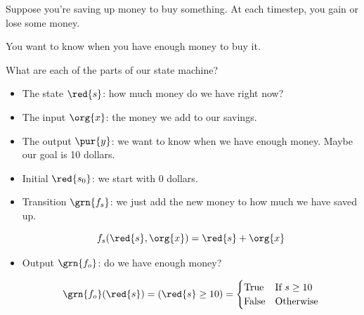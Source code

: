             Suppose you're saving up money to buy something. At each timestep, you gain or lose some money. 
            
            You want to know when you have enough money to buy it. 
                
            What are each of the parts of our state machine?
            
            \begin{itemize}
                \item The state $\red{s}$: how much money do we have right now?
                
                \item The input $\org{x}$: the money we add to our savings.
                
                \item The output $\pur{y}$: we want to know when we have enough money. Maybe our goal is 10 dollars.
                
                \item Initial $\red{s_0}$: we start with 0 dollars.
                
                \item Transition $\grn{f_s}$: we just add the new money to how much we have saved up.
                
                    \begin{equation}
                        f_s(\red{s},\org{x}) = \red{s}+\org{x}
                    \end{equation}
                    
                \item Output $\grn{f_o}$: do we have enough money?
                
                    \begin{equation}
                        \grn{f_o}(\red{s}) = (\red{s} \geq 10)
                        =
                        \begin{cases}
                            \text{True} & \text{If } s \geq 10 \\
                            \text{False} & \text{Otherwise}
                        \end{cases}
                    \end{equation}
            \end{itemize}
            
